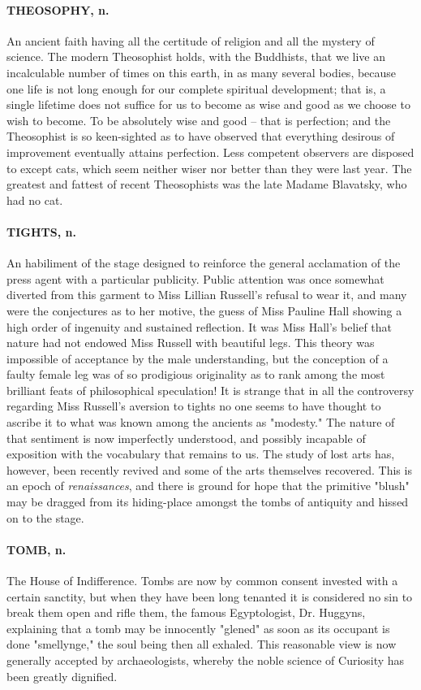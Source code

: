 \documentclass[11pt]{article}
\begin{document}
\paragraph{THEOSOPHY, n.}  An ancient faith having all the certitude of religion
and all the mystery of science.  The modern Theosophist holds, with
the Buddhists, that we live an incalculable number of times on this
earth, in as many several bodies, because one life is not long enough
for our complete spiritual development; that is, a single lifetime
does not suffice for us to become as wise and good as we choose to
wish to become.  To be absolutely wise and good -- that is perfection;
and the Theosophist is so keen-sighted as to have observed that
everything desirous of improvement eventually attains perfection.
Less competent observers are disposed to except cats, which seem
neither wiser nor better than they were last year.  The greatest and
fattest of recent Theosophists was the late Madame Blavatsky, who had
no cat.

\paragraph{TIGHTS, n.}  An habiliment of the stage designed to reinforce the
general acclamation of the press agent with a particular publicity.
Public attention was once somewhat diverted from this garment to Miss
Lillian Russell's refusal to wear it, and many were the conjectures as
to her motive, the guess of Miss Pauline Hall showing a high order of
ingenuity and sustained reflection.  It was Miss Hall's belief that
nature had not endowed Miss Russell with beautiful legs.  This theory
was impossible of acceptance by the male understanding, but the
conception of a faulty female leg was of so prodigious originality as
to rank among the most brilliant feats of philosophical speculation!
It is strange that in all the controversy regarding Miss Russell's
aversion to tights no one seems to have thought to ascribe it to what
was known among the ancients as "modesty."  The nature of that
sentiment is now imperfectly understood, and possibly incapable of
exposition with the vocabulary that remains to us.  The study of lost
arts has, however, been recently revived and some of the arts
themselves recovered.  This is an epoch of {\em renaissances}, and there
is ground for hope that the primitive "blush" may be dragged from its
hiding-place amongst the tombs of antiquity and hissed on to the
stage.

\paragraph{TOMB, n.}  The House of Indifference.  Tombs are now by common consent
invested with a certain sanctity, but when they have been long
tenanted it is considered no sin to break them open and rifle them,
the famous Egyptologist, Dr. Huggyns, explaining that a tomb may be
innocently "glened" as soon as its occupant is done "smellynge," the
soul being then all exhaled.  This reasonable view is now generally
accepted by archaeologists, whereby the noble science of Curiosity has
been greatly dignified.
\end{document}
